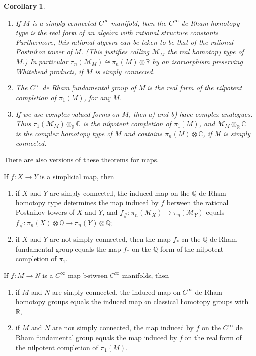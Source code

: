 \documentclass[11pt]{amsart}
\theoremstyle{plain}
\newtheorem{corollary}[theorem]{Corollary}
\theoremstyle{definition}
\newcommand{\cM}{\mathcal{M}}
\newcommand{\CC}{\mathbb{C}}
\newcommand{\RR}{\mathbb{R}}
\newcommand{\QQ}{\mathbb{Q}}
\begin{document}
\begin{corollary}\label{thm:3.4}
\begin{enumerate}
\item[(a)] If $M$ is a simply connected $C^{\infty}$ manifold, then the $C^{\infty}$ de Rham homotopy type is the real form of an algebra with rational structure constants. Furthermore, this rational algebra can be taken to be that of the rational Postnikov tower of $M$. (This justifies calling $\cM_{M}$ the \emph{real homotopy type} of $M$.) In particular $\pi_{n}(\cM_{M}) \cong \pi_{n}(M) \otimes \RR$ by an isomorphism preserving Whitehead products, if $M$ is simply connected.
\item[(b)] The $C^{\infty}$ de Rham fundamental group of $M$ is the real form of the nilpotent completion of $\pi_{1}(M)$, for any $M$.
\item[(c)] If we use complex valued forms on $M$, then a) and b) have complex analogues. Thus $\pi_{1}(\cM_{M}) \otimes_{\RR} \CC$ is the nilpotent completion of $\pi_{1}(M)$, and $\cM_{M} \otimes_{\RR} \CC$ is the \emph{complex homotopy type} of $M$ and contains $\pi_{n}(M) \otimes \CC$, if $M$ is simply connected.
\end{enumerate}
\end{corollary}

There are also versions of these theorems for maps.

If $f \colon X \to Y$ is a simplicial map, then
\begin{enumerate}
\item if $X$ and $Y$ are simply connected, the induced map on the $\QQ$-de Rham homotopy type determines the map induced by $f$ between the rational Postnikov towers of $X$ and $Y$, and $f_{\#} \colon \pi_{n}(\cM_{X}) \to \pi_{n}(\cM_{Y})$ equals $f_{\#} \colon \pi_{n}(X) \otimes \QQ \to \pi_{n}(Y) \otimes \QQ$;
\item if $X$ and $Y$ are not simply connected, then the map $f_{*}$ on the $\QQ$-de Rham fundamental group equals the map $f_{*}$ on the $\QQ$ form of the nilpotent completion of $\pi_{1}$.
\end{enumerate}

If $f \colon M \to N$ is a $C^{\infty}$ map between $C^{\infty}$ manifolds, then
\begin{enumerate}
\item if $M$ and $N$ are simply connected, the induced map on $C^{\infty}$ de Rham homotopy groups equals the induced map on classical homotopy groups with $\RR$,
\item if $M$ and $N$ are non simply connected, the map induced by $f$ on the $C^{\infty}$ de Rham fundamental group equals the map induced by $f$ on the real form of the nilpotent completion of $\pi_{1}(M)$.
\end{enumerate}
\end{document}
